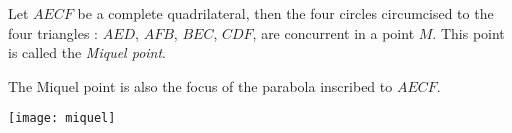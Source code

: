\documentclass[12pt]{article}
\begin{document}
Let $AECF$ be a complete quadrilateral, then the four circles
circumcised to the four triangles : $AED$, $AFB$, $BEC$, $CDF$,
are concurrent in a point $M$. This point is called the
\emph{Miquel point}.

The Miquel point is also the focus of the parabola inscribed to
$AECF$.

\begin{center}
\texttt{[image: miquel]}
\end{center}
\end{document}
